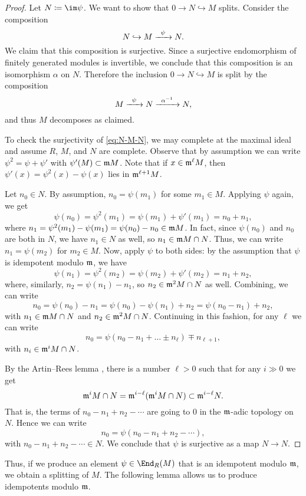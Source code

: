 \documentclass[12pt]{article}
\let\inc\hookrightarrow
\theoremstyle{theorem}
\numberwithin{thm}{section}
\theoremstyle{definition}
\begin{document}
\begin{proof}
  Let $N \coloneqq \im\psi$. We want to show that $0 \to N \inc M$ splits. Consider the composition
  \begin{equation}\label{eq:N-M-N}
    N \inc M \xra{\psi} N.
  \end{equation}
  We claim that this composition is surjective. Since a surjective endomorphism of finitely generated modules is invertible, we conclude that this composition is an isomorphism $\alpha$ on $N$.
  Therefore the inclusion $ 0 \to N \inc M $ is split by the composition
  \[ M \xra{\psi} N \xra{\alpha\inv} N, \]
  and thus $M$ decomposes as claimed.

  To check the surjectivity of \eqref{eq:N-M-N}, we may complete at the maximal ideal and assume $R$, $M$, and $N$ are complete. Observe that by assumption we can write $\psi^2 = \psi + \psi'$ with $\psi'(M)\subset \mathfrak m M$.
  Note that if $x \in \mathfrak m^\ell M$, then $\psi'(x) = \psi^2(x) - \psi(x)$ lies in $\mathfrak m^{\ell+1}M$.


  Let $n_0\in N$. By assumption, $n_0 = \psi(m_1)$ for some $m_1\in M$. Applying $\psi$ again, we get
  \[ \psi(n_0) = \psi^2(m_1) = \psi(m_1) + \psi'(m_1) = n_0 + n_1, \]
  where $n_1 = \psi^2(m_1) - \psi(m_1) = \psi(n_0) - n_0 \in \mathfrak m M$. In fact, since $\psi(n_0)$ and $n_0$ are both in $N$, we have $n_1\in N$ as well, so $n_1\in \mathfrak m M\cap N$. Thus, we can write $n_1 = \psi(m_2)$ for $m_2\in M$.
  Now, apply $\psi$ to both sides: by the assumption that $\psi$ is idempotent modulo $\mathfrak m$, we have
  \[ \psi(n_1)=\psi^2(m_2) = \psi(m_2) + \psi'(m_2) = n_1 + n_2, \]
  where, similarly, $n_2 = \psi(n_1) - n_1$, so $n_2 \in \mathfrak m^2M\cap N$ as well.
  Combining, we can write
  \[ n_0 = \psi(n_0) - n_1 = \psi(n_0) - \psi(n_1) + n_2 = \psi(n_0 - n_1) + n_2, \]
  with $n_1\in \mathfrak m M\cap N$ and $n_2\in \mathfrak m^2M\cap N$. Continuing in this fashion, for any $\ell$ we can write
  \[ n_0=\psi(n_0-n_1+\dots \pm n_{\ell}) \mp n_{\ell+1}, \]
  with $n_i \in \mathfrak m^i M\cap N$.

  By the Artin--Rees lemma \cite[Lemma~5.1]{Eisenbud95}, there is a number $\ell>0$ such that for any $i\gg0$ we get
  \[ \mathfrak m^i M\cap N = \mathfrak m^{i-\ell} ( \mathfrak m^i M\cap N)\subset \mathfrak m^{i-\ell} N. \]
  That is, the terms of $n_0-n_1+n_2-\cdots$ are going to 0 in the $\mathfrak m$-adic topology on $N$. Hence we can write
  \[ n_0 = \psi(n_0-n_1+n_2-\cdots), \]
  with $n_0-n_1+n_2-\cdots\in N$. We conclude that $\psi$ is surjective as a map $N\to N$.
\end{proof}

Thus, if we produce an element $\psi \in \End_R(M)$ that is an idempotent modulo $\mathfrak m$, we obtain a splitting of $M$.
The following lemma allows us to produce idempotents modulo $\mathfrak m$.
\end{document}
